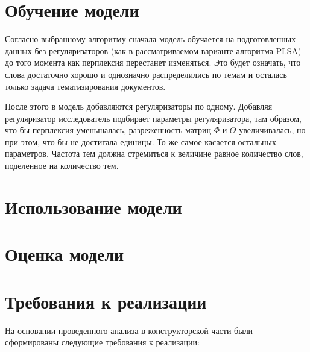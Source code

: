 %
\section{Обучение модели}

Согласно выбранному алгоритму сначала модель обучается на подготовленных данных без регуляризаторов (как в рассматриваемом варианте алгоритма PLSA) до того момента как перплексия перестанет изменяться. Это будет означать, что слова достаточно хорошо и однозначно распределились по темам и осталась только задача тематизирования документов.

После этого в модель добавляются регуляризаторы по одному. Добавляя регуляризатор исследователь подбирает параметры регуляризатора, там образом, что бы перплексия уменьшалась, разреженность матриц $\Phi$ и $\Theta$ увеличивалась, но при этом, что бы не достигала единицы. То же самое касается остальных параметров. Частота тем должна стремиться к величине равное количество слов, поделенное на количество тем.

%
\section{Использование модели}

%
\section{Оценка модели}

%
\section{Требования к реализации}

На основании проведенного анализа в конструкторской части были сформированы следующие требования к реализации:

